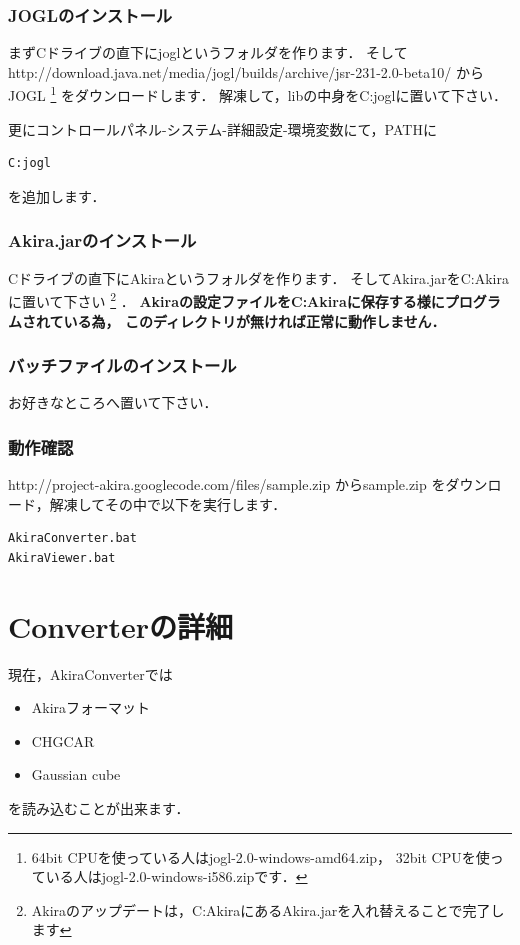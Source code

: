 \documentclass[a4j,openany]{jbook}
\begin{document}
  \subsection{JOGLのインストール}
  まずCドライブの直下にjoglというフォルダを作ります．
  そして
  {http://download.java.net/media/jogl/builds/archive/jsr-231-2.0-beta10/}
  からJOGL
  \footnote{64bit CPUを使っている人はjogl-2.0-windows-amd64.zip，
  32bit CPUを使っている人はjogl-2.0-windows-i586.zipです．}
  をダウンロードします．
  解凍して，libの中身をC:joglに置いて下さい．

   更にコントロールパネル-システム-詳細設定-環境変数にて，PATHに
   \begin{screen}
\begin{verbatim}
C:jogl
\end{verbatim}
   \end{screen}
   を追加します．

  \subsection{Akira.jarのインストール}
  Cドライブの直下にAkiraというフォルダを作ります．
  そしてAkira.jarをC:Akiraに置いて下さい
  \footnote{Akiraのアップデートは，C:AkiraにあるAkira.jarを入れ替えることで完了します}
  ．
  {\bf Akiraの設定ファイルをC:Akiraに保存する様にプログラムされている為，
  このディレクトリが無ければ正常に動作しません．}

  \subsection{バッチファイルのインストール}
  お好きなところへ置いて下さい．

  \subsection{動作確認}
  {http://project-akira.googlecode.com/files/sample.zip}
  からsample.zip
  をダウンロード，解凍してその中で以下を実行します．
   \begin{screen}
\begin{verbatim}
AkiraConverter.bat
AkiraViewer.bat
\end{verbatim}
   \end{screen}

\chapter{Converterの詳細}
現在，AkiraConverterでは
 \begin{itemize}
  \item Akiraフォーマット
  \item CHGCAR
  \item Gaussian cube
 \end{itemize}
 を読み込むことが出来ます．
\end{document}
